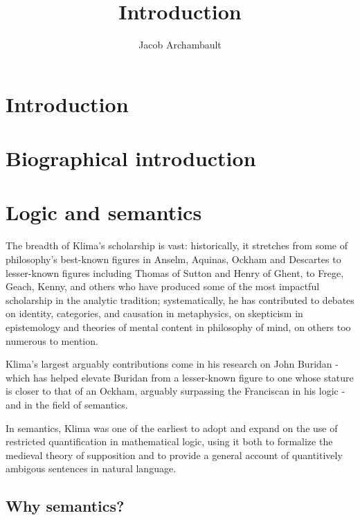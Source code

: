 \documentclass[]{article}
\title{Introduction}
\author{Jacob Archambault}
\begin{document}
\maketitle

\begin{abstract}

\end{abstract}

\section{Introduction}
\section{Biographical introduction}
\section{Logic and semantics}
The breadth of Klima's scholarship is vast: 
historically, it stretches from some of philosophy's best-known figures in Anselm, Aquinas, Ockham and Descartes to lesser-known figures including Thomas of Sutton and Henry of Ghent, to Frege, Geach, Kenny, and others who have produced some of the most impactful scholarship in the analytic tradition; 
systematically, he has contributed to debates on identity, categories, and causation in metaphysics, on skepticism in epistemology and theories of mental content in philosophy of mind, on others too numerous to mention.

Klima's largest arguably contributions come in his research on John Buridan - which has helped elevate Buridan from a lesser-known figure to one whose stature is closer to that of an Ockham, arguably surpassing the Franciscan in his logic - and in the field of semantics. 

In semantics, Klima was one of the earliest to adopt and expand on the use of restricted quantification in mathematical logic, using it both to formalize the medieval theory of supposition and to provide a general account of quantitively ambigous sentences in natural language.

\subsection{Why semantics?}
\end{document}
